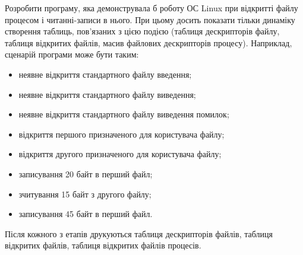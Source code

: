 \documentclass[a4paper,12pt]{article}
\begin{document}
    Розробити програму, яка демонструвала б роботу ОС Linux при відкритті файлу процесом і читанні-записи в нього. При
    цьому досить показати тільки динаміку створення таблиць, пов'язаних з цією подією (таблиця дескрипторів файлу,
    таблиця відкритих файлів, масив файлових дескрипторів процесу). Наприклад, сценарій програми може бути таким:
    \begin{itemize}
        \item неявне відкриття стандартного файлу введення;
        \item неявне відкриття стандартного файлу виведення;
        \item неявне відкриття стандартного файлу виведення помилок;
        \item відкриття першого призначеного для користувача файлу;
        \item відкриття другого призначеного для користувача файлу;
        \item записування 20 байт в перший файл;
        \item зчитування 15 байт з другого файлу;
        \item записування 45 байт в перший файл. 
    \end{itemize}

    Після кожного з етапів друкуються таблиця дескрипторів файлів, таблиця відкритих файлів, таблиця відкритих файлів процесів.
\end{document}
